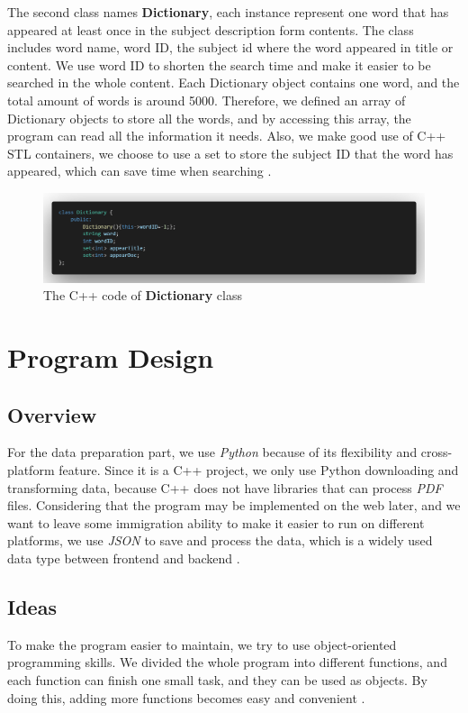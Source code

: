 \documentclass[manuscript,screen,review,12pt]{acmart}
\begin{document}
The second class names \textbf{Dictionary}, each instance represent one word that has appeared at least once in the subject description form contents. The class includes word name, word ID, the subject id where the word appeared in title or content. We use word ID to shorten the search time and make it easier to be searched in the whole content. Each Dictionary object contains one word, and the total amount of words is around 5000. Therefore, we defined an array of Dictionary objects to store all the words, and by accessing this array, the program can read all the information it needs. Also, we make good use of C++ STL containers, we choose to use a set to store the subject ID that the word has appeared, which can save time when searching \cite{prata2002c++}.

\begin{figure}[h]
  \centering
  \includegraphics[width=\linewidth]{simplifieddictionary.png}
  \caption{The C++ code of \textbf{Dictionary} class}
\end{figure}

\section{Program Design}

\subsection{Overview}
For the data preparation part, we use \textit{Python} because of its flexibility and cross-platform feature. Since it is a C++ project, we only use Python downloading and transforming data, because C++ does not have libraries that can process \textit{PDF} files. Considering that the program may be implemented on the web later, and we want to leave some immigration ability to make it easier to run on different platforms, we use \textit{JSON} to save and process the data, which is a widely used data type between frontend and backend \cite{nurseitov2009comparison}. 

\subsection{Ideas}
To make the program easier to maintain, we try to use object-oriented programming skills. We divided the whole program into different functions, and each function can finish one small task, and they can be used as objects. By doing this, adding more functions becomes easy and convenient \cite{lafore1997object}.
\end{document}
